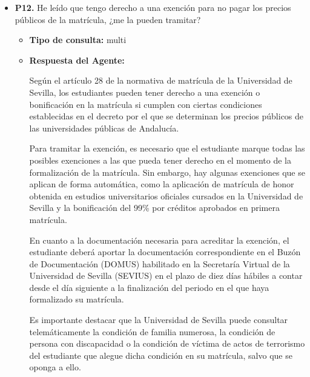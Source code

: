 \documentclass{article}
\begin{document}
\begin{itemize}
\begin{itemize}
                        En cuanto a los plazos y fechas, no se especifican fechas concretas en el contexto proporcionado. Sin embargo, se menciona que la edición de la clasificación de referencia para la baremación es la del año de publicación del artículo, o en su defecto, la inmediata anterior. También se menciona que la Revisión 4 del documento de ayuda al candidato es de \textbf{marzo de 2025}, y la Revisión 3 es de \textbf{diciembre de 2024}.
                  \item \textbf{Contexto utilizado:}

            \end{itemize}

      \item \textbf{P12.} He leído que tengo derecho a una exención para no pagar los precios públicos de la matrícula, ¿me la pueden tramitar? \\
            \begin{itemize}
                  \item \textbf{Tipo de consulta:} multi
                  \item \textbf{Respuesta del Agente:}

                        Según el artículo 28 de la normativa de matrícula de la Universidad de Sevilla, los estudiantes pueden tener derecho a una exención o bonificación en la matrícula si cumplen con ciertas condiciones establecidas en el decreto por el que se determinan los precios públicos de las universidades públicas de Andalucía.

                        Para tramitar la exención, es necesario que el estudiante marque todas las posibles exenciones a las que pueda tener derecho en el momento de la formalización de la matrícula. Sin embargo, hay algunas exenciones que se aplican de forma automática, como la aplicación de matrícula de honor obtenida en estudios universitarios oficiales cursados en la Universidad de Sevilla y la bonificación del 99\% por créditos aprobados en primera matrícula.

                        En cuanto a la documentación necesaria para acreditar la exención, el estudiante deberá aportar la documentación correspondiente en el Buzón de Documentación (DOMUS) habilitado en la Secretaría Virtual de la Universidad de Sevilla (SEVIUS) en el plazo de diez días hábiles a contar desde el día siguiente a la finalización del periodo en el que haya formalizado su matrícula.

                        Es importante destacar que la Universidad de Sevilla puede consultar telemáticamente la condición de familia numerosa, la condición de persona con discapacidad o la condición de víctima de actos de terrorismo del estudiante que alegue dicha condición en su matrícula, salvo que se oponga a ello.


\end{itemize}
\end{itemize}
\end{document}
